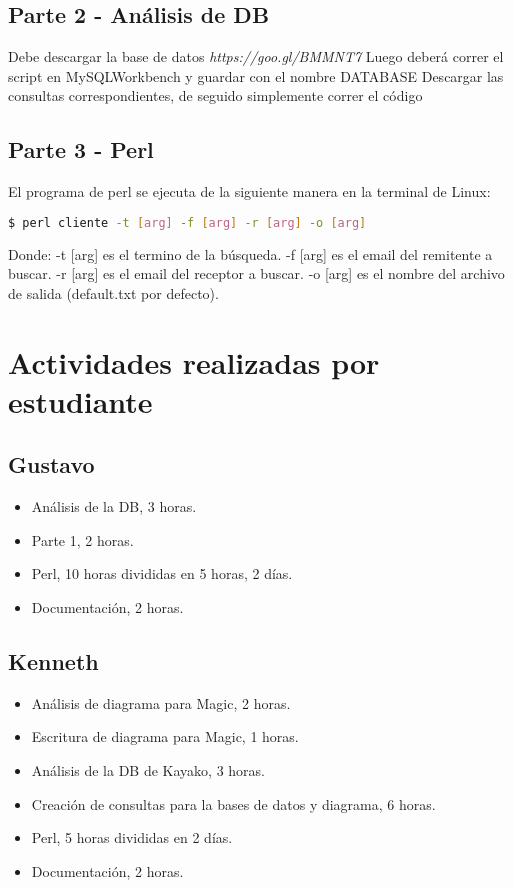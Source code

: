 \documentclass{article}
\begin{document}
\subsection{Parte 2 - Análisis de DB}
Debe descargar la base de datos \textit{https://goo.gl/BMMNT7}
Luego deberá correr el script en MySQLWorkbench y guardar con el nombre DATABASE
Descargar las consultas correspondientes, de seguido simplemente correr el código

\subsection{Parte 3 - Perl}
El programa de perl se ejecuta de la siguiente manera en la terminal de Linux:
\begin{lstlisting}[language=bash]
  $ perl cliente -t [arg] -f [arg] -r [arg] -o [arg]
\end{lstlisting}

Donde:\newline
-t [arg] es el termino de la búsqueda.\newline
-f [arg] es el email del remitente a buscar.\newline
-r [arg] es el email del receptor a buscar.\newline
-o [arg] es el nombre del  archivo de salida (default.txt por defecto).
\section{Actividades realizadas por estudiante}
\subsection{Gustavo}
\begin{itemize}
    \item Análisis de la DB, 3 horas.
    \item Parte 1, 2 horas.
    \item Perl, 10 horas divididas en 5 horas, 2 días. 
    \item Documentación, 2 horas.
\end{itemize}

\subsection{Kenneth}
\begin{itemize}
    \item Análisis de diagrama para Magic, 2 horas.
    \item Escritura de diagrama para Magic, 1 horas.
    \item Análisis de la DB de Kayako, 3 horas.
    \item Creación de consultas para la bases de datos y diagrama, 6 horas.
    \item Perl, 5 horas divididas en 2 días. 
    \item Documentación, 2 horas.
\end{itemize}
\end{document}

